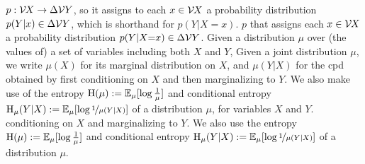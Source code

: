 \ifvfull
$p : \mathcal V\mskip-1.5mu  X \to \Delta \mathcal V Y$, so it assigns to each $x \in \mathcal V\mskip-1.5mu X$ a
probability distribution 
$p(Y|x) \in \Delta \mathcal V Y$, which is shorthand for $p(Y|X{=}x)$.
\else
$p$ that assigns each $x \in \mathcal V\mskip-1.5mu X$ a probability distribution
$p(Y|X{=}x) \in \Delta \mathcal V Y$.
\fi
\ifvfull
Given a distribution $\mu$ over (the values of) a set of variables including both $X$ and $Y$,
\else
Given a joint distribution $\mu$,
\fi
we write $\mu(X)$ for its marginal distribution on $X$,
and $\mu(Y|X)$ for the cpd obtained by 
\ifvfull
first conditioning on $X$ and then marginalizing to $Y$.
We also make use of the entropy $\operatorname{\mathrm{H}}(\mu) := \operatorname*{\mathbb{E}}_{\mu} [\log \frac1\mu]$ and conditional entropy $\operatorname{\mathrm{H}}_\mu(Y|X) := \operatorname*{\mathbb{E}}_\mu[\log\nicefrac1{\mu(Y|X)}]$ of a distribution $\mu$,
for variables $X$ and $Y$.
\else
conditioning on $X$ and marginalizing to $Y$.
We also use the entropy $\operatorname{\mathrm{H}}(\mu) := \operatorname*{\mathbb{E}}_{\mu} [\log \frac1\mu]$ and conditional entropy $\operatorname{\mathrm{H}}_\mu(Y|X) := \operatorname*{\mathbb{E}}_\mu[\log\nicefrac1{\mu(Y|X)}]$ of a distribution $\mu$.
\fi




